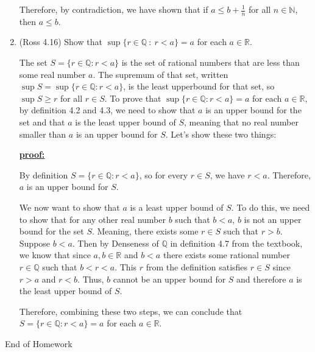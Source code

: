 \documentclass [10pt]{article}
\newcommand{\jg}[1]{{\color{blue} #1}}
\begin{document}
\begin{enumerate}
{Therefore, by contradiction, we have shown that if $a \leq b+\frac{1}{n}$ for all $n \in \mathbb{N}$, then $a \leq b$. 
}
\clearpage
\item (Ross 4.16)
Show that $\sup \{ r \in \mathbb{Q}~:~ r < a\}= a$ for each $a \in \mathbb{R}.$

\jg{
The set $S = \{r \in \mathbb{Q} : r < a\}$ is the set of rational numbers that are less than some real number $a$. The supremum of that set, written $\sup S = \sup \{r \in \mathbb{Q} : r < a\} $, is the least upperbound for that set, so $\sup S \geq r$ for all $r \in S$. To prove that $\sup \{r \in \mathbb{Q} : r < a\} = a$ for each $a \in \mathbb{R}$, by definition 4.2 and 4.3, we need to show that $a$ is an upper bound for the set and that $a$ is the least upper bound of $S$, meaning that no real number smaller than $a$ is an upper bound for $S$. Let's show these two things: 

\textbf{\underline{proof:}} 

By definition $S = \{r \in \mathbb{Q} : r < a\}$, so for every $r \in S$, we have $r < a$. Therefore, $a$ is an upper bound for $S$. 

We now want to show that $a$ is a least upper bound of $S$. To do this, we need to show that for any other real number $b$ such that $b < a$, $b$ is not an upper bound for the set $S$. Meaning, there exists some $r \in S$ such that $r > b$. Suppose $b < a$. Then by Denseness of $\mathbb{Q}$ in definition 4.7 from the textbook, we know that since $a, b \in \mathbb{R}$ and $b < a$ there exists some rational number $r \in \mathbb{Q}$ such that $b < r < a$. This $r$ from the definition satisfies $r \in S$ since $r > a$ and $r < b$. Thus, $b$ cannot be an upper bound for $S$ and therefore $a$ is the least upper bound of $S$. 

Therefore, combining these two steps, we can conclude that $S = \{r \in \mathbb{Q} : r < a\} =a$ for each $a \in \mathbb{R}$. 
}
\end{enumerate}
\clearpage
\begin{center}
\vspace*{\fill}
{\Large End of Homework}
\vspace*{\fill}
\end{center}
\end{document}
